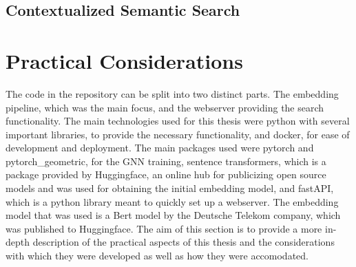 \documentclass[draft,final]{vutinfth} %
\begin{document}
\section{Contextualized Semantic Search}




\chapter{Practical Considerations}
The code in the repository can be split into two distinct parts. The embedding pipeline, which was the main focus, and the webserver providing the search functionality. 
The main technologies used for this thesis were python with several important libraries, to provide the necessary functionality, and docker, for ease of development and deployment. The main packages used were pytorch and pytorch\_geometric, for the GNN training, sentence transformers, which is a package provided by Huggingface, an online hub for publicizing open source models and was used for obtaining the initial embedding model, and fastAPI, which is a python library meant to quickly set up a webserver.
The embedding model that was used is a Bert model by the Deutsche Telekom company, which was published to Huggingface. \cite{german_bert}
The aim of this section is to provide a more in-depth description of the practical aspects of this thesis and the considerations with which they were developed as well as how they were accomodated.
\end{document}

